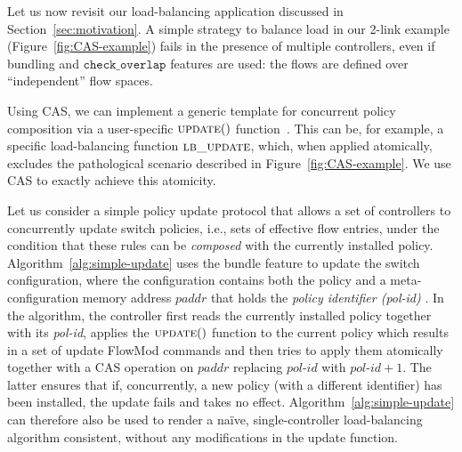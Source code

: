 \documentclass[conference]{sigcomm-alternate}
\newcommand{\paddr}{\textit{paddr}\xspace}
\newcommand{\pid}{\textit{pol-id}\xspace}
\newcommand{\checko}{\texttt{check\_overlap}\xspace}
\newcommand{\ufunc}{update} %
\newcommand{\liron}[1]{\textit{\textcolor{mypurple}{[liron]: #1}}} %
\newcommand{\petr}[1]{\textit{\textcolor{blue}{[petr]: #1}}} %
\newcommand{\execatomic}{\textbf{execute-transaction}}
\begin{document}
Let us now revisit our load-balancing application
discussed in Section~\ref{sec:motivation}.
A simple strategy to balance load in our 2-link example
 (Figure~\ref{fig:CAS-example}) fails in the presence of
multiple controllers, even if 
bundling and $\checko$ features are used:
the flows are defined over ``independent'' 
flow spaces. 

Using CAS, we can implement a
generic template 
for concurrent policy composition via a user-specific
$\textsc{\ufunc}()$ function~\cite{stn}.
This can be, for example, a specific load-balancing
function $\textsc{lb\_update}$, %
which, when applied atomically, excludes the pathological scenario described in 
Figure~\ref{fig:CAS-example}. 
We use CAS to exactly achieve this atomicity.

Let us consider a simple policy update protocol that
allows a set of  controllers to concurrently update switch policies, i.e., sets of
effective flow entries, under the
condition that these rules can be \emph{composed} with the currently installed
policy.
Algorithm~\ref{alg:simple-update} uses the bundle feature to update
the switch configuration, where the configuration contains both the
policy and a meta-configuration memory address $\paddr$ that holds the \emph{policy identifier (\pid)} .
In the algorithm, the controller first reads the currently installed
policy together with its {\pid},  applies the
$\textsc{\ufunc}()$ function to the current policy which results in a
set of update FlowMod commands and then tries to apply them
atomically together with a CAS operation on $\paddr$ replacing $\pid$
with $\pid+1$.
The latter ensures that if, concurrently, a new policy (with a different identifier) has been installed, the update
fails and takes no effect.
Algorithm~\ref{alg:simple-update} can therefore also be used
to render a na\"ive, single-controller load-balancing algorithm
consistent, without any modifications in the update function.


\end{document}
